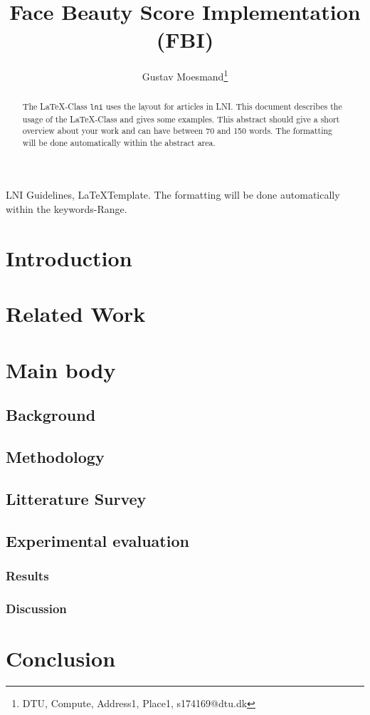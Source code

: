 \documentclass[english]{lni}
\author{Gustav Moesmand\footnote{DTU, Compute, Address1, Place1, s174169@dtu.dk}}
\title{Face Beauty Score Implementation (FBI)}
\renewcommand{\headrulewidth}{0.4pt} %
\begin{document}
\maketitle
\renewcommand{\refname}{References}
\setcounter{footnote}{2} %
\thispagestyle{titlepage}
\pagestyle{fancy}
\fancyhead{} %
\fancyfoot{} %
\renewcommand{\headrulewidth}{0.4pt} %

\begin{abstract}
	The \LaTeX-Class \texttt{lni} uses the layout for articles in LNI. This document describes the usage of the \LaTeX-Class and gives some examples. This abstract should give a short overview about your work and can have between 70 and 150 words. The formatting will be done automatically within the abstract area.
\end{abstract}
\begin{keywords}
	LNI Guidelines, \LaTeX Template. The formatting will be done automatically within the keywords-Range.
\end{keywords}

\section{Introduction}

\section{Related Work}

\section{Main body}
\subsection{Background}
\subsection{Methodology}
\subsection{Litterature Survey}
\subsection{Experimental evaluation}
\subsubsection{Results}
\subsubsection{Discussion}

\section{Conclusion}
\end{document}
